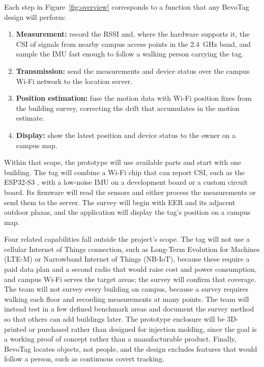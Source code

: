 \documentclass[12pt,letterpaper]{article}
\begin{document}
Each step in Figure~\ref{fig:overview} corresponds to a function that any BevoTag design will
perform:
\begin{enumerate}
  \item \textbf{Measurement:} record the RSSI and, where the hardware supports it, the CSI of
    signals from nearby campus access points in the 2.4~GHz band, and sample the IMU fast enough to
    follow a walking person carrying the tag.
  \item \textbf{Transmission:} send the measurements and device status over the campus Wi-Fi
    network to the location server.
  \item \textbf{Position estimation:} fuse the motion data with Wi-Fi position fixes from the
    building survey, correcting the drift that accumulates in the motion estimate.
  \item \textbf{Display:} show the latest position and device status to the owner on a campus map.
\end{enumerate}

Within that scope, the prototype will use available parts and start with one building. The tag
will combine a Wi-Fi chip that can report CSI, such as the ESP32-S3 \cite{espcsi}, with a low-noise
IMU on a development board or a custom circuit board. Its firmware will read the sensors and either
process the measurements or send them to the server. The survey will begin with EER and its
adjacent outdoor plazas, and the application will display the tag's position on a campus map.

Four related capabilities fall outside the project's scope. The tag will not use a cellular
Internet of Things connection, such as Long-Term Evolution for Machines (LTE-M) or Narrowband
Internet of Things (NB-IoT), because these require a paid data plan and a second radio that would
raise cost and power consumption, and campus Wi-Fi serves the target areas; the survey will confirm
that coverage. The team will not survey every building on campus, because a survey requires walking
each floor and recording measurements at many points. The team will instead test in a few defined
benchmark areas and document the survey method so that others can add buildings later. The
prototype enclosure will be 3D-printed or purchased rather than designed for injection molding,
since the goal is a working proof of concept rather than a manufacturable product. Finally,
BevoTag locates objects, not people, and the design excludes features that would follow a person,
such as continuous covert tracking.
\end{document}

